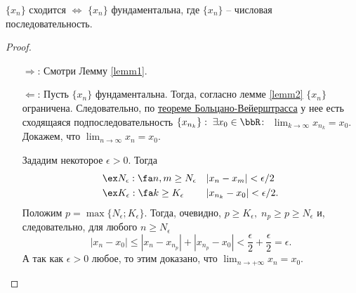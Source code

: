 \begin{thm} 
$\{x_n\}$ сходится $\Longleftrightarrow$ $\{x_n\}$ фундаментальна, где $\{x_n\}$ -- числовая последовательность.
\end{thm}
\begin{proof}
$ $\linebreak
\vspace*{-\baselineskip}
\begin{itemize}
\item[$\Longrightarrow$:]
Смотри Лемму \ref{lemm1}.
\item[$\Longleftarrow$:]
Пусть $\{x_n\}$ фундаментальна. Тогда, согласно лемме \ref{lemm2} $\{x_n\}$ ограничена. Следовательно, по \hyperref[exp9]{теореме Больцано-Вейерштрасса} у нее есть сходящаяся подпоследовательность $\{x_{n_k}\}: \;\exists x_0 \in \bbR\colon$ $\lim_{k \to \infty}\limits x_{n_k} =x_0 $. Докажем, что $\lim_{n \to \infty}\limits x_{n}=x_0 $.

Зададим некоторое $\epsilon > 0$. Тогда
\begin{gather*}
\begin{aligned}
& \ex N_\epsilon : \fa n,m \ge N_\epsilon &&|x_n-x_m|<\epsilon/2\\
& \ex K_\epsilon : \fa k \ge K_\epsilon   &&|x_{n_k}-x_0|<\epsilon/2.
\end{aligned}
\end{gather*}
Положим $p=\max\{N_\epsilon;K_\epsilon\}$. Тогда, очевидно, $p \ge K_\epsilon,\; n_p \ge p \ge N_\epsilon$ и, следовательно, для любого $n \ge N_\epsilon$
$$
|x_n-x_0| \le |x_n-x_{n_p}|+|x_{n_p}-x_0|<\frac{\epsilon}{2}+\frac{\epsilon}{2}=\epsilon.
$$
А так как $\epsilon > 0$ любое, то этим доказано, что $\lim_{n \to +\infty}\limits x_n = x_0$.
\end{itemize}
\vspace{-1.65\baselineskip}
\end{proof}

